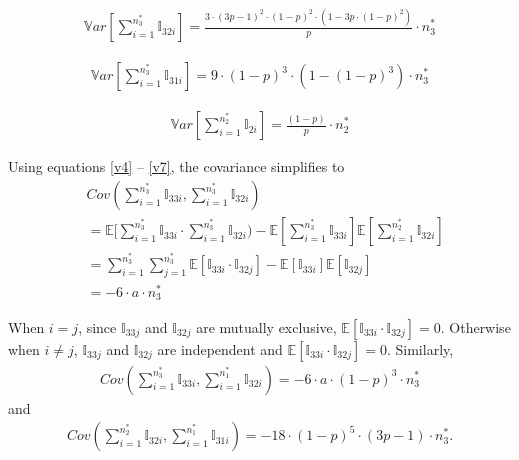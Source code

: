\documentclass{imsart}
\begin{document}
\begin{equation}
\label{v5}
\begin{split}
\mathbb{V}ar[\sum_{i=1}^{n_3^*}{\mathbb{I}_{32i}}]
= \frac{3 \cdot (3p-1)^2 \cdot (1-p)^2 \cdot (1-3p \cdot (1-p)^2)}{p} \cdot n_3^*
\end{split}
\end{equation}

\begin{equation}
\label{v6}
\begin{split}
\mathbb{V}ar[\sum_{i=1}^{n_3^*}{\mathbb{I}_{31i}}]
= 9 \cdot (1-p)^3 \cdot (1-(1-p)^3) \cdot n_3^*
\end{split}
\end{equation}

\begin{equation}
\label{v7}
\begin{split}
\mathbb{V}ar[\sum_{i=1}^{n_2^*}{\mathbb{I}_{2i}}]
= \frac{(1-p)}{p} \cdot n_2^*
\end{split}
\end{equation}

Using equations \ref{v4} -- \ref{v7}, the covariance simplifies to
\begin{equation*}
\begin{split}
&Cov(\sum_{i=1}^{n_3^*}{\mathbb{I}_{33i}}, \sum_{i=1}^{n_3^*}{\mathbb{I}_{32i}})\\
&=  \mathbb{E}[\sum_{i=1}^{n_3^*}{\mathbb{I}_{33i}} \cdot \sum_{i=1}^{n_3^*}{\mathbb{I}_{32i}}) -  	\mathbb{E}[\sum_{i=1}^{n_3^*}{\mathbb{I}_{33i}}] \mathbb{E}[\sum_{i=1}^{n_2^*}{\mathbb{I}_{32i}}]\\
&=  \sum_{i=1}^{n_3^*}{\sum_{j=1}^{n_3^*}{
		\mathbb{E}[\mathbb{I}_{33i} \cdot \mathbb{I}_{32j}] -  	
		\mathbb{E}[\mathbb{I}_{33i}]
		\mathbb{E}[\mathbb{I}_{32j}]}}\\
&=-6 \cdot a \cdot n_3^*
\end{split}
\end{equation*}

When $i=j$, since $\mathbb{I}_{33j}$ and $\mathbb{I}_{32j}$ are mutually exclusive, $\mathbb{E}[\mathbb{I}_{33i} \cdot \mathbb{I}_{32j}]=0$. Otherwise when $i \neq j$, $\mathbb{I}_{33j}$ and $\mathbb{I}_{32j}$ are independent and $\mathbb{E}[\mathbb{I}_{33i} \cdot \mathbb{I}_{32j}]=0$. Similarly,
\begin{equation*}
\begin{split}
Cov(\sum_{i=1}^{n_3^*}{\mathbb{I}_{33i}}, \sum_{i=1}^{n_1^*}{\mathbb{I}_{32i}})
= - 6 \cdot a \cdot (1-p)^3 \cdot n_3^*
\end{split}
\end{equation*}
and
\begin{equation*}
\begin{split}
Cov(\sum_{i=1}^{n_2^*}{\mathbb{I}_{32i}}, \sum_{i=1}^{n_1^*}{\mathbb{I}_{31i}})
= - 18 \cdot (1-p)^5 \cdot (3p-1) \cdot n_3^*.
\end{split}
\end{equation*}
\end{document}
